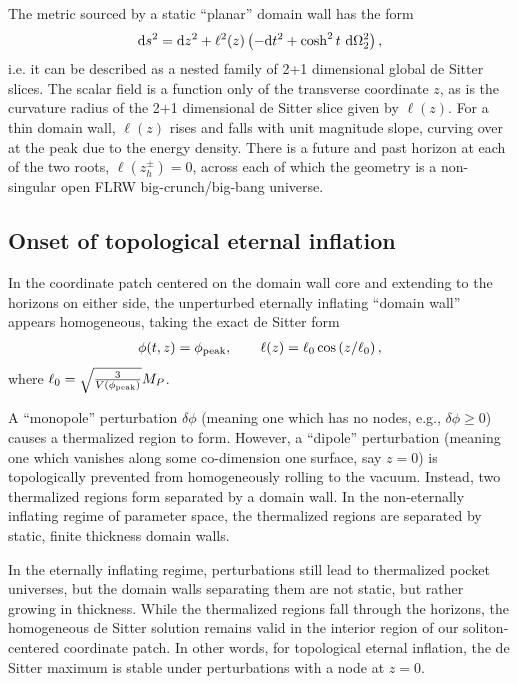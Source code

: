 \documentclass[aps,amsfonts,amsmath,prd,preprint,nofootinbib,superscriptaddress]{revtex4}
\newcommand{\Mp}{{M_{P}}}
\newcommand{\rmd}{{\rm d}}
\begin{document}
\begin{appendix}
The metric sourced by a static ``planar'' domain wall has the form
\begin{align}
\rmd s^2 = \rmd z^2 + \ell^2(z)\left( -\rmd t^2 + \cosh^2 t~\rmd \Omega_2^2\right),\label{eq:ISVmetric}
\end{align}
i.e. it can be described as a nested family of 2+1 dimensional global de Sitter slices.  The scalar field is a function only of the transverse coordinate $z$, as is the curvature radius of the 2+1 dimensional de Sitter slice
given by $\ell(z)$.  For a thin domain wall, $\ell(z)$ rises and falls with unit magnitude slope, curving over at the peak due to the energy density.  There is a future and past horizon at each of the two roots, $\ell(z_h^\pm) = 0$, across each of which the geometry is a non-singular open FLRW big-crunch/big-bang universe.



\subsection{Onset of topological eternal inflation}
In the coordinate patch centered on the domain wall core and extending to the horizons on either side,
the unperturbed eternally inflating ``domain wall'' appears homogeneous, taking the exact de Sitter form
\begin{align}
\phi(t,z) = \phi_{\rm peak}, \qquad \ell(z) = \ell_0\cos\left(z/\ell_0 \right),
\end{align}
where $\ell_0 = \sqrt{\frac{3}{V(\phi_{\rm peak})}}\Mp$.   

A ``monopole'' perturbation $\delta\phi$ (meaning one which has no nodes, e.g., $\delta\phi \geq 0$) causes a thermalized region to form.  However, a ``dipole'' perturbation
(meaning one which vanishes along some co-dimension one surface, say $z=0$) is topologically prevented from homogeneously rolling to the vacuum.  Instead, two thermalized regions form separated by a domain wall.
In the non-eternally inflating regime of parameter space, the thermalized regions are separated by static, finite thickness domain walls.  

In the eternally inflating regime, perturbations still lead to thermalized pocket universes, but the domain walls separating them are not static, but rather growing in thickness.
While the thermalized regions fall through the horizons, the homogeneous de Sitter solution remains valid in the interior region of our soliton-centered coordinate patch.
In other words, for topological eternal inflation, the de Sitter maximum is stable under perturbations with a node at $z = 0$.  


\end{appendix}
\end{document}
